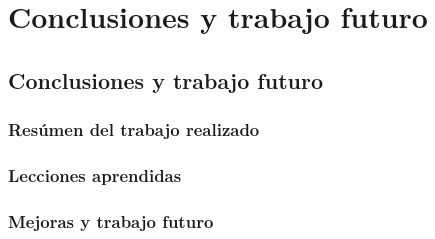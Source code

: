 \chapter{Conclusiones y trabajo futuro}
\label{chapter:Conclusiones y trabajo futuro}



\section{Conclusiones y trabajo futuro}


\subsection{Resúmen del trabajo realizado}

\subsection{Lecciones aprendidas}

\subsection{Mejoras y trabajo futuro}